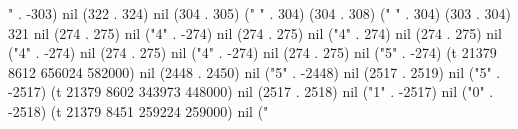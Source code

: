 {" . -303) nil (322 . 324) nil (304 . 305) ("    " . 304) (304 . 308) (" " . 304) (303 . 304) 321 nil (274 . 275) nil ("4" . -274) nil (274 . 275) nil ("4" . 274) nil (274 . 275) nil ("4" . -274) nil (274 . 275) nil ("4" . -274) nil (274 . 275) nil ("5" . -274) (t 21379 8612 656024 582000) nil (2448 . 2450) nil ("5" . -2448) nil (2517 . 2519) nil ("5" . -2517) (t 21379 8602 343973 448000) nil (2517 . 2518) nil ("1" . -2517) nil ("0" . -2518) (t 21379 8451 259224 259000) nil ("%
}
